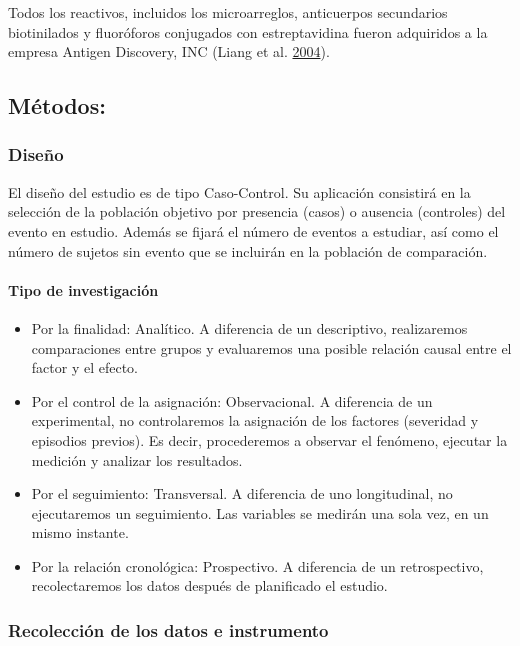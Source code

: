 \documentclass[
  a4paper]{article}
\let\oldparagraph\paragraph
\renewcommand{\paragraph}[1]{\oldparagraph{#1}\mbox{}}
\begin{document}
Todos los reactivos, incluidos los microarreglos, anticuerpos
secundarios biotinilados y fluoróforos conjugados con estreptavidina
fueron adquiridos a la empresa Antigen Discovery, INC (Liang et al.
\protect\hyperlink{ref-adiinc}{2004}).

\hypertarget{muxe9todos}{%
\subsection{Métodos:}\label{muxe9todos}}

\hypertarget{diseuxf1o}{%
\subsubsection{Diseño}\label{diseuxf1o}}

El diseño del estudio es de tipo Caso-Control. Su aplicación consistirá
en la selección de la población objetivo por presencia (casos) o
ausencia (controles) del evento en estudio. Además se fijará el número
de eventos a estudiar, así como el número de sujetos sin evento que se
incluirán en la población de comparación.

\hypertarget{tipo-de-investigaciuxf3n}{%
\paragraph{Tipo de investigación}\label{tipo-de-investigaciuxf3n}}

\begin{itemize}
\item
  Por la finalidad: Analítico. A diferencia de un descriptivo,
  realizaremos comparaciones entre grupos y evaluaremos una posible
  relación causal entre el factor y el efecto.
\item
  Por el control de la asignación: Observacional. A diferencia de un
  experimental, no controlaremos la asignación de los factores
  (severidad y episodios previos). Es decir, procederemos a observar el
  fenómeno, ejecutar la medición y analizar los resultados.
\item
  Por el seguimiento: Transversal. A diferencia de uno longitudinal, no
  ejecutaremos un seguimiento. Las variables se medirán una sola vez, en
  un mismo instante.
\item
  Por la relación cronológica: Prospectivo. A diferencia de un
  retrospectivo, recolectaremos los datos después de planificado el
  estudio.
\end{itemize}

\hypertarget{recolecciuxf3n-de-los-datos-e-instrumento}{%
\subsubsection{Recolección de los datos e
instrumento}\label{recolecciuxf3n-de-los-datos-e-instrumento}}
\end{document}
